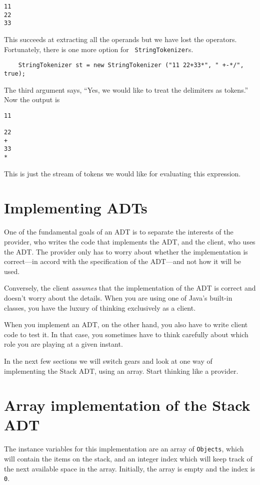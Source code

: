 \begin{verbatim}
11
22
33
\end{verbatim}
%
This succeeds at extracting all the operands but we have lost the
operators.  Fortunately, there is one more option for {\tt
StringTokenizer}s.

\begin{verbatim}
    StringTokenizer st = new StringTokenizer ("11 22+33*", " +-*/", true);
\end{verbatim}
%
The third argument says, ``Yes, we would like to treat the delimiters
as tokens.''  Now the output is

\begin{verbatim}
11
 
22
+
33
*
\end{verbatim}
%
This is just the stream of tokens we would like for evaluating
this expression.


\section {Implementing ADTs}

One of the fundamental goals of an ADT is to separate the
interests of the provider, who writes the code that implements
the ADT, and the client, who uses the ADT.
The provider only has to worry
about whether the implementation is correct---in accord
with the specification of the ADT---and not how it will be used.

Conversely, the client {\em assumes} that the implementation of the
ADT is correct and doesn't worry about the details.  When you
are using one of Java's built-in classes, you have the luxury
of thinking exclusively as a client.

When you implement an ADT, on the other hand, you also have
to write client code to test it.  In that case, you sometimes
have to think carefully about which role you are playing at
a given instant.

In the next few sections we will switch gears and look at one way of
implementing the Stack ADT, using an array.  Start thinking like a
provider.


\section {Array implementation of the Stack ADT}
\label{arraystack}

The instance variables for this implementation are
an array of {\tt Objects}, which will contain the items on
the stack, and an integer index which will keep track of
the next available space in the array.
Initially, the array is empty and the index is {\tt 0}.

